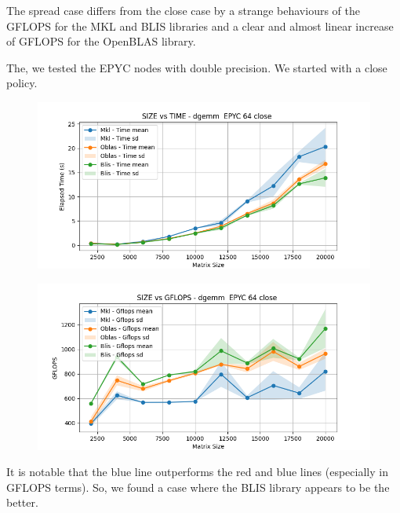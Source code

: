 \documentclass{article}
\begin{document}
The spread case differs from the close case by a strange behaviours of the GFLOPS for the MKL and BLIS libraries and a clear and almost linear increase of GFLOPS for the OpenBLAS library. 

The, we tested the EPYC nodes with double precision. We started with a close policy.
\begin{figure}[H]
    \centering
    \includegraphics[width=\textwidth]{EPYC 64/dgemm__EPYC_64_close_time.png}
\end{figure}

\begin{figure}[H]
    \centering
    \includegraphics[width=\textwidth]{EPYC 64/dgemm__EPYC_64_close_gflops.png}
\end{figure}

It is notable that the blue line outperforms the red and blue lines (especially in GFLOPS terms). So, we found a case where the BLIS library appears to be the better. 
\end{document}
